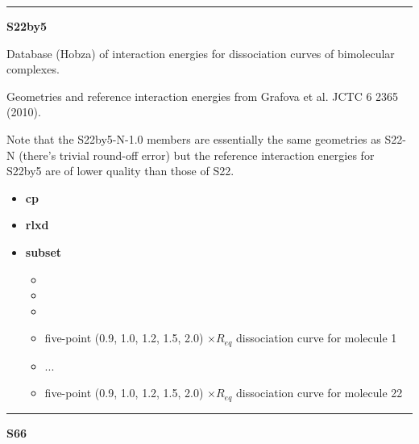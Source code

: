 \documentclass[letterpaper,10pt,english]{sphinxmanual}
\begin{document}
\bigskip\hrule{}\bigskip

\label{db:module-S22by5}
\textbf{S22by5}

\begin{DUlineblock}{0em}
\item[] Database (Hobza) of interaction energies for dissociation curves of bimolecular complexes.
\item[] Geometries and reference interaction energies from Grafova et al. JCTC 6 2365 (2010).
\item[] Note that the S22by5-N-1.0 members are essentially the same geometries as S22-N (there's trivial round-off error) but the reference interaction energies for S22by5 are of lower quality than those of S22.
\end{DUlineblock}
\begin{itemize}
\item {} 
\textbf{cp}   \textbar{}\textbar{} 

\item {} 
\textbf{rlxd} 

\item {} 
\textbf{subset}
\begin{itemize}
\item {} 

\item {} 

\item {} 

\item {} 
 five-point (0.9, 1.0, 1.2, 1.5, 2.0) $\times R_{eq}$ dissociation curve for molecule 1

\item {} 
...

\item {} 
 five-point (0.9, 1.0, 1.2, 1.5, 2.0) $\times R_{eq}$ dissociation curve for molecule 22

\end{itemize}

\end{itemize}


\bigskip\hrule{}\bigskip

\label{db:module-S66}
\textbf{S66}
\end{document}
